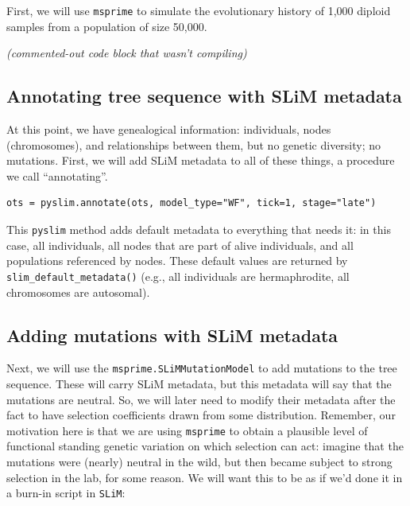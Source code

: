 \documentclass[12pt]{article}
\newcommand{\msprime}[0]{\texttt{msprime}\xspace}
\newcommand{\slim}[0]{\texttt{SLiM}\xspace}
\newcommand{\pyslim}[0]{\texttt{pyslim}\xspace}
\newcommand{\comment}[1]{\textit{\color{green} #1}}
\begin{document}
 First, we will use \msprime to simulate the evolutionary history of 1,000 diploid samples from a population of size 50,000.

\comment{(commented-out code block that wasn't compiling)}

\subsection*{Annotating tree sequence with SLiM metadata}

At this point, we have genealogical information: individuals, nodes (chromosomes), and relationships between them,
but no genetic diversity; no mutations. 
First, we will add SLiM metadata to all of these things, a procedure we call “annotating”.
\begin{listing}[H]
  \begin{verbatim}
ots = pyslim.annotate(ots, model_type="WF", tick=1, stage="late")
  \end{verbatim}
\end{listing}

This \pyslim method adds default metadata to everything that needs it:
in this case, all individuals, all nodes that are part of alive individuals, and all populations referenced by nodes.
These default values are returned by \verb|slim_default_metadata()| (e.g., all individuals are hermaphrodite, all chromosomes are autosomal).

\subsection*{Adding mutations with SLiM metadata}

Next, we will use the \verb|msprime.SLiMMutationModel| to add mutations to the tree sequence.
These will carry SLiM metadata, but this metadata will say that the mutations are neutral.
So, we will later need to modify their metadata after the fact to have selection coefficients drawn from some distribution.
Remember, our motivation here is that we are using \msprime to obtain a plausible level of functional standing genetic variation on which selection can act:
imagine that the mutations were (nearly) neutral in the wild, but then became subject to strong selection in the lab, for some reason.
We will want this to be as if we'd done it in a burn-in script in \slim :
\end{document}
